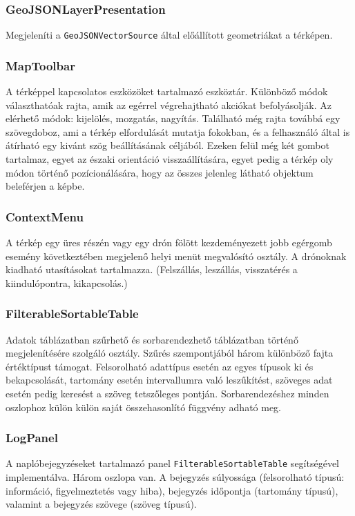 \subsubsection{GeoJSONLayerPresentation}
Megjeleníti a \verb|GeoJSONVectorSource| által előállított geometriákat a
térképen.

\subsubsection{MapToolbar}
A térképpel kapcsolatos eszközöket tartalmazó eszköztár. Különböző módok
választhatóak rajta, amik az egérrel végrehajtható akciókat befolyásolják. Az
elérhető módok: kijelölés, mozgatás, nagyítás. Található még rajta továbbá egy
szövegdoboz, ami a térkép elfordulását mutatja fokokban, és a felhasználó által
is átírható egy kivánt szög beállításának céljából. Ezeken felül még két gombot
tartalmaz, egyet az északi orientáció visszaállítására, egyet pedig a térkép oly
módon történő pozícionálására, hogy az összes jelenleg látható objektum
beleférjen a képbe.

\subsubsection{ContextMenu}
A térkép egy üres részén vagy egy drón fölött kezdeményezett jobb egérgomb
esemény következtében megjelenő helyi menüt megvalósító osztály. A drónoknak
kiadható utasításokat tartalmazza. (Felszállás, leszállás, visszatérés a
kiindulópontra, kikapcsolás.)

\subsubsection{FilterableSortableTable}
Adatok táblázatban szűrhető és sorbarendezhető táblázatban történő
megjelenítésére szolgáló osztály. Szűrés szempontjából három különböző fajta
értéktípust támogat. Felsorolható adattípus esetén az egyes típusok ki és
bekapcsolását, tartomány esetén intervallumra való leszűkítést, szöveges adat
esetén pedig keresést a szöveg tetszőleges pontján. Sorbarendezéshez minden
oszlophoz külön külön saját összehasonlító függvény adható meg.

\subsubsection{LogPanel}

A naplóbejegyzéseket tartalmazó panel \verb|FilterableSortableTable|
segítségével implementálva. Három oszlopa van. A bejegyzés súlyossága
(felsorolható típusú: információ, figyelmeztetés vagy hiba), bejegyzés időpontja
(tartomány típusú), valamint a bejegyzés szövege (szöveg típusú).

